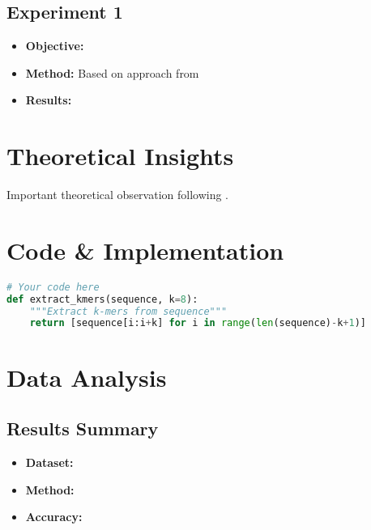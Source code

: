 \documentclass[a4paper,11pt]{article}
\begin{document}
\subsection{Experiment 1}

\begin{itemize}
    \item \textbf{Objective:} 
    \item \textbf{Method:} Based on approach from \cite{example2024}
    \item \textbf{Results:} 
\end{itemize}

\section{Theoretical Insights}

\begin{remark}
Important theoretical observation following \citet{author2024}.
\end{remark}

\section{Code \& Implementation}

\begin{lstlisting}[language=Python, caption=Sample code based on \protect\cite{smith2024}]
# Your code here
def extract_kmers(sequence, k=8):
    """Extract k-mers from sequence"""
    return [sequence[i:i+k] for i in range(len(sequence)-k+1)]
\end{lstlisting}

\section{Data Analysis}


\subsection{Results Summary}

\begin{itemize}
    \item \textbf{Dataset:} 
    \item \textbf{Method:} 
    \item \textbf{Accuracy:} 
\end{itemize}
\end{document}
